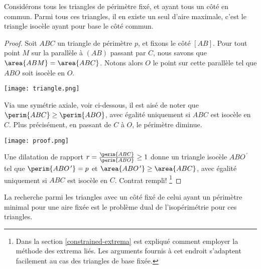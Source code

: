 \begin{fact} \label{tri-one-side-fixed}
    Considérons tous les triangles de périmètre fixé, et ayant tous un côté en commun.
    Parmi tous ces triangles, il en existe un seul d'aire maximale, c'est le triangle isocèle ayant pour base le côté commun.
\end{fact}


\begin{proof}
    Soit $ABC$ un triangle de périmètre $p$, et fixons le côté $[AB]$.
    Pour tout point $M$ sur la parallèle à $(AB)$ passant par $C$, nous savons que $\area{ABM} = \area{ABC}$. Notons alors $O$ le point sur cette parallèle tel que $ABO$ soit isocèle en $O$.

    \begin{center}
        \texttt{[image: triangle.png]}
    \end{center}


    Via une symétrie axiale, voir ci-dessous, il est aisé de noter que $\perim{ABC} \geq \perim{ABO}$, avec égalité uniquement si $ABC$ est isocèle en $C$.
    Plus précisément, en passant de $C$ à $O$, le périmètre diminue.

    \begin{center}
        \texttt{[image: proof.png]}
    \end{center}

    Une dilatation  de rapport $r = \frac{\perim{ABC}}{\perim{ABO}} \geq 1$ donne un triangle isocèle $ABO^{\,\prime}$ tel que
    $\perim{ABO^{\,\prime}} = p$
    et
    $\area{ABO^{\,\prime}} \geq \area{ABC}$, avec égalité uniquement si $ABC$ est isocèle en $C$.
    Contrat rempli!%
    \footnote{
        Dans la section \ref{constrained-extrema} est expliqué comment employer la méthode des extrema liés.
        Les arguments fournis à cet endroit s'adaptent facilement au cas des triangles de base fixée.
    }
\end{proof}




\begin{remark}
    La recherche parmi les triangles avec un côté fixé de celui ayant un périmètre minimal pour une aire fixée est le problème dual de l'isopérimétrie pour ces triangles.
\end{remark}
